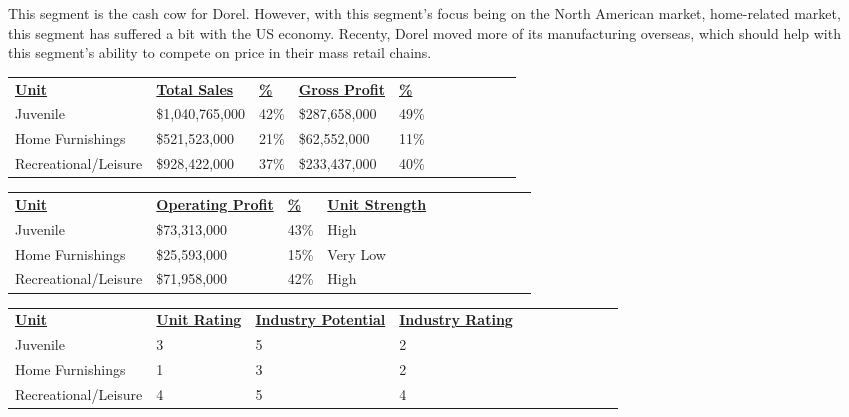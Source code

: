 This segment is the cash cow for Dorel.  However, with this segment’s focus being on the North American market, home-related market, this segment has suffered a bit with the US economy.  Recenty, Dorel moved more of its manufacturing overseas, which should help with this segment’s ability to compete on price in their mass retail chains.

\begin{table}[h]
    \begin{tabular}{lllllllllll}
    {\bf \underline{Unit}}                 & {\bf \underline{Total Sales}}    & {\bf \underline{\%}}  & {\bf \underline{Gross Profit}} & {\bf \underline{\%}}\\
    Juvenile             & \$1,040,765,000 & 42\% & \$287,658,000 & 49\% \\
    Home Furnishings     & \$521,523,000  & 21\% & \$62,552,000 & 11\% \\
    Recreational/Leisure & \$928,422,000  & 37\% & \$233,437,000 & 40\% \\
    \end{tabular}
\end{table}

\begin{table}[h]
    \begin{tabular}{lllllllllll}
    {\bf \underline{Unit}}             &  {\bf \underline{Operating Profit}} & {\bf \underline{\%}}  & {\bf \underline{Unit Strength}} \\
    Juvenile             & \$73,313,000     & 43\% & High \\
    Home Furnishings     & \$25,593,000     & 15\% & Very Low \\
    Recreational/Leisure  & \$71,958,000     & 42\% & High \\
    \end{tabular}
\end{table}

\begin{table}[h]
    \begin{tabular}{lllllllllll}
    {\bf \underline{Unit}}               &{\bf \underline{Unit Rating}} &  {\bf \underline{Industry Potential}} &{\bf \underline{Industry Rating}} \\
    Juvenile             & 3           & 5                  & 2               \\
    Home Furnishings      & 1           & 3                  & 2               \\
    Recreational/Leisure  & 4           & 5                  & 4               \\
    \end{tabular}
\end{table}

